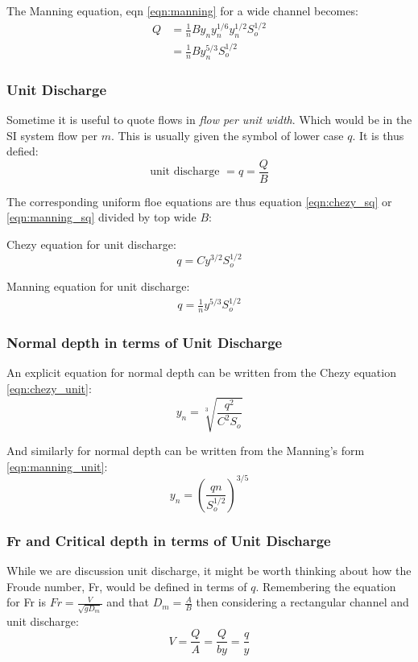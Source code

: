 \documentclass[a4paper, 12pt, british]{article} %
\numberwithin{equation}{section}
\numberwithin{figure}{section}
\numberwithin{table}{section}
\begin{document}
	The Manning equation, eqn \ref{eqn:manning} for a wide channel becomes:
	\begin{align}
	Q &= \frac{1}{n}By_{n} y_{n}^{1/6} y_{n}^{1/2} S_o^{1/2} \nonumber \\
	&= \frac{1}{n}By_{n}^{5/3}  S_o^{1/2}
	\label{eqn:manning_wide}
	\end{align}
	
	
	
	\subsubsection*{Unit Discharge}
	Sometime it is useful to quote flows in \textit{flow per unit width}. Which would be in the SI system flow per $m$.
	This is usually given the symbol of lower case $q$. It is thus defied:
	\begin{equation}
	\text{unit discharge } = q = \frac{Q}{B}
	\end{equation}
	
	The corresponding uniform floe equations are thus equation \ref{eqn:chezy_sq} or \ref{eqn:manning_sq} divided by top wide $B$:
	
	Chezy equation for unit discharge:
	\begin{equation}
	q = Cy^{3/2}S_o^{1/2}
	\label{eqn:chezy_unit}
	\end{equation}
	
	Manning equation for unit discharge:
	\begin{align}
	q = \frac{1}{n}y^{5/3}  S_o^{1/2}
	\label{eqn:manning_unit}
	\end{align}
	
	\subsubsection*{Normal depth in terms of Unit Discharge}
	An explicit equation for normal depth can be written from the Chezy equation \ref{eqn:chezy_unit}: 
	\begin{equation}
	y_{n} = \sqrt[3]{\frac{q^2}{C^2S_o}}
	\label{eqn:chezy_yn_unit_q}
	\end{equation}
	
	And similarly for normal depth can be written from the Manning's form \ref{eqn:manning_unit}: 
	\begin{equation}
	y_{n} = \left(\frac{qn}{S_o^{1/2}}\right)^{3/5}
	\label{eqn:manning_yn_unit_q}
	\end{equation}
	
	\subsubsection*{Fr and Critical depth in terms of Unit Discharge}
	While we are discussion unit discharge, it might be worth thinking about how the Froude number, Fr, would be defined in terms of $q$. Remembering the equation for Fr is $Fr = \frac{V}{\sqrt{gD_m}}$ and that $D_m = \frac{A}{B}$ then considering a rectangular channel and unit discharge:
	\begin{equation*}
	V = \frac{Q}{A}=\frac{Q}{by}=\frac{q}{y}
	\end{equation*}
	
\end{document}
